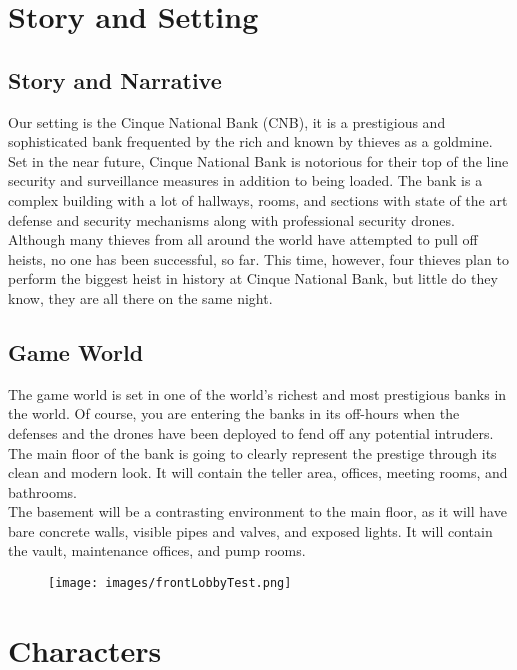 \documentclass[10pt]{report}
\begin{document}
\chapter{Story and Setting}

\section{Story and Narrative}

Our setting is the Cinque National Bank (CNB), it is a prestigious and sophisticated bank frequented by the rich and known by thieves as a goldmine. Set in the near future, Cinque National Bank is notorious for their top of the line security and surveillance measures in addition to being loaded.  The bank is a complex building with a lot of hallways, rooms, and sections with state of the art defense and security mechanisms along with professional security drones. Although many thieves from all around the world have attempted to pull off heists, no one has been successful, so far. This time, however, four thieves plan to perform the biggest heist in history at Cinque National Bank, but little do they know, they are all there on the same night.

\section{Game World}

The game world is set in one of the world’s richest and most prestigious banks in the world. Of course, you are entering the banks in its off-hours when the defenses and the drones have been deployed to fend off any potential intruders. \\
The main floor of the bank is going to clearly represent the prestige through its clean and modern look. It will contain the teller area, offices, meeting rooms, and bathrooms. \\
The basement will be a contrasting environment to the main floor, as it will have bare concrete walls, visible pipes and valves, and exposed lights. It will contain the vault, maintenance offices, and pump rooms. 

\begin{figure}
    \centering
    \texttt{[image: images/frontLobbyTest.png]}
    \caption{}
\end{figure}

\chapter{Characters}
\end{document}

